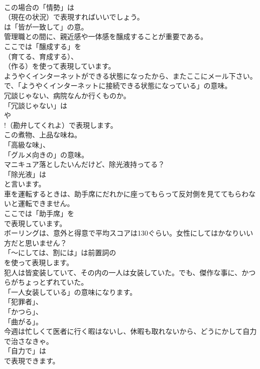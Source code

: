 \documentclass[8pt]{extreport}
\begin{document}
\begin{CJK}{UTF8}{min}
\\	この場合の「情勢」は 
\\	（現在の状況）で表現すればいいでしょう。
\\	は「皆が一致して」の意。	
\\	管理職との間に、親近感や一体感を醸成することが重要である。 
\\	ここでは「醸成する」を 
\\	（育てる、育成する）、
\\	（作る）を使って表現しています。	
\\	ようやくインターネットができる状態になったから、またここにメール下さい。 
\\	で、「ようやくインターネットに接続できる状態になっている」の意味。	
\\	冗談じゃない、病院なんか行くものか。 
\\	「冗談じゃない」は 
\\	や 
\\	!（勘弁してくれよ）で表現します。	
\\	この煮物、上品な味ね。 
\\	「高級な味」、
\\	「グルメ向きの」の意味。	
\\	マニキュア落としたいんだけど、除光液持ってる？ 
\\	「除光液」は
\\	と言います。	
\\	車を運転するときは、助手席にだれかに座ってもらって反対側を見ててもらわないと運転できません。 
\\	ここでは「助手席」を 
\\	で表現しています。	
\\	ボーリングは、意外と得意で平均スコアは130ぐらい。女性にしてはかなりいい方だと思いません？ 
\\	「～にしては、割には」は前置詞の
\\	を使って表現します。	
\\	犯人は皆変装していて、その内の一人は女装していた。でも、傑作な事に、かつらがちょっとずれていた。 
\\	「一人女装している」の意味になります。
\\	「犯罪者」、
\\	「かつら」、
\\	「曲がる」。	
\\	今週は忙しくて医者に行く暇はないし、休暇も取れないから、どうにかして自力で治さなきゃ。 
\\	「自力で」は
\\	で表現できます。

\end{CJK}
\end{document}
